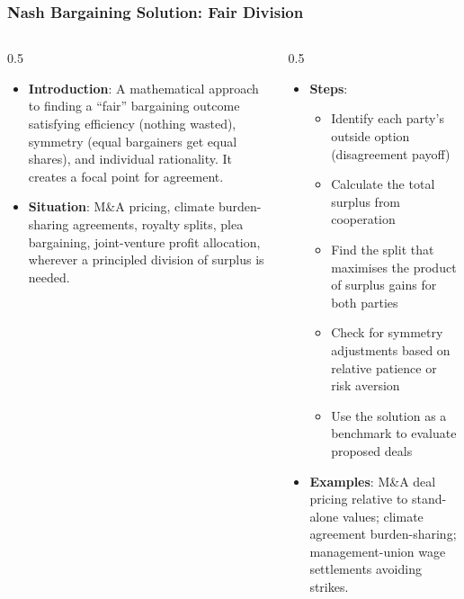 \begin{frame}[fragile]\frametitle{Nash Bargaining Solution: Fair Division}
\begin{columns}
    \begin{column}[T]{0.5\linewidth}
      \begin{itemize}
        \item \textbf{Introduction}: A mathematical approach to finding a ``fair'' bargaining outcome satisfying efficiency (nothing wasted), symmetry (equal bargainers get equal shares), and individual rationality. It creates a focal point for agreement.
        \item \textbf{Situation}: M\&A pricing, climate burden-sharing agreements, royalty splits, plea bargaining, joint-venture profit allocation, wherever a principled division of surplus is needed.
      \end{itemize}
    \end{column}
    \begin{column}[T]{0.5\linewidth}
      \begin{itemize}
        \item \textbf{Steps}:
        \begin{itemize}
          \item Identify each party's outside option (disagreement payoff)
          \item Calculate the total surplus from cooperation
          \item Find the split that maximises the product of surplus gains for both parties
          \item Check for symmetry adjustments based on relative patience or risk aversion
          \item Use the solution as a benchmark to evaluate proposed deals
        \end{itemize}\item \textbf{Examples}: M\&A deal pricing relative to stand-alone values; climate agreement burden-sharing; management-union wage settlements avoiding strikes.
      \end{itemize}
    \end{column}
  \end{columns}
\end{frame}

